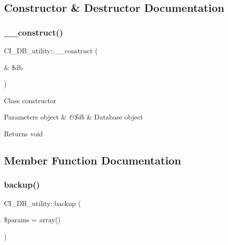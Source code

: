 \subsection{Constructor \& Destructor Documentation}
\mbox{\label{class_c_i___d_b__utility_a319c5b270bc28b50011b82cb473e4108}} 
\subsubsection{\texorpdfstring{\+\_\+\+\_\+construct()}{\_\_construct()}}
{\footnotesize\ttfamily C\+I\+\_\+\+D\+B\+\_\+utility\+::\+\_\+\+\_\+construct (\begin{DoxyParamCaption}\item[{\&}]{\$db }\end{DoxyParamCaption})}

Class constructor


\begin{DoxyParams}[1]{Parameters}
object & {\em \&\$db} & Database object \\
\hline
\end{DoxyParams}
\begin{DoxyReturn}{Returns}
void 
\end{DoxyReturn}


\subsection{Member Function Documentation}
\mbox{\label{class_c_i___d_b__utility_ab993a335f089f7aeccc2ae9aa076be4e}} 
\subsubsection{\texorpdfstring{backup()}{backup()}}
{\footnotesize\ttfamily C\+I\+\_\+\+D\+B\+\_\+utility\+::backup (\begin{DoxyParamCaption}\item[{}]{\$params = {\ttfamily array()} }\end{DoxyParamCaption})}

